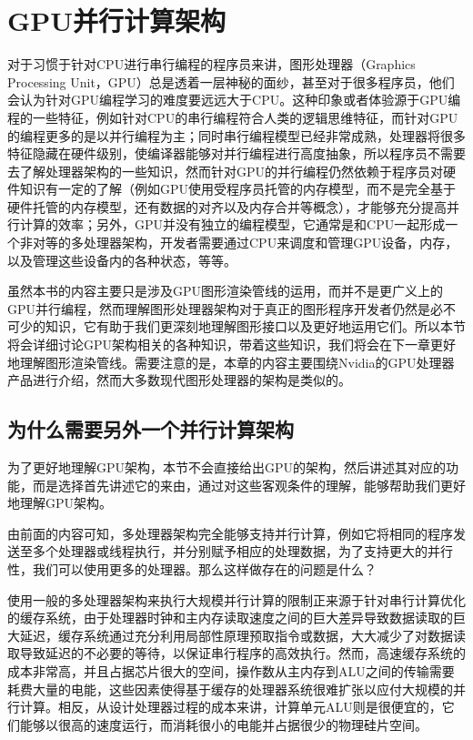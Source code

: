\section{GPU并行计算架构}
对于习惯于针对CPU进行串行编程的程序员来讲，图形处理器（Graphics Processing Unit，GPU）总是透着一层神秘的面纱，甚至对于很多程序员，他们会认为针对GPU编程学习的难度要远远大于CPU。这种印象或者体验源于GPU编程的一些特征，例如针对CPU的串行编程符合人类的逻辑思维特征，而针对GPU的编程更多的是以并行编程为主；同时串行编程模型已经非常成熟，处理器将很多特征隐藏在硬件级别，使编译器能够对并行编程进行高度抽象，所以程序员不需要去了解处理器架构的一些知识，然而针对GPU的并行编程仍然依赖于程序员对硬件知识有一定的了解（例如GPU使用受程序员托管的内存模型，而不是完全基于硬件托管的内存模型，还有数据的对齐以及内存合并等概念），才能够充分提高并行计算的效率；另外，GPU并没有独立的编程模型，它通常是和CPU一起形成一个非对等的多处理器架构，开发者需要通过CPU来调度和管理GPU设备，内存，以及管理这些设备内的各种状态，等等。

虽然本书的内容主要只是涉及GPU图形渲染管线的运用，而并不是更广义上的GPU并行编程，然而理解图形处理器架构对于真正的图形程序开发者仍然是必不可少的知识，它有助于我们更深刻地理解图形接口以及更好地运用它们。所以本节将会详细讨论GPU架构相关的各种知识，带着这些知识，我们将会在下一章更好地理解图形渲染管线。需要注意的是，本章的内容主要围绕Nvidia的GPU处理器产品进行介绍，然而大多数现代图形处理器的架构是类似的。






\subsection{为什么需要另外一个并行计算架构}
为了更好地理解GPU架构，本节不会直接给出GPU的架构，然后讲述其对应的功能，而是选择首先讲述它的来由，通过对这些客观条件的理解，能够帮助我们更好地理解GPU架构。

由前面的内容可知，多处理器架构完全能够支持并行计算，例如它将相同的程序发送至多个处理器或线程执行，并分别赋予相应的处理数据，为了支持更大的并行性，我们可以使用更多的处理器。那么这样做存在的问题是什么？

使用一般的多处理器架构来执行大规模并行计算的限制正来源于针对串行计算优化的缓存系统，由于处理器时钟和主内存读取速度之间的巨大差异导致数据读取的巨大延迟，缓存系统通过充分利用局部性原理预取指令或数据，大大减少了对数据读取导致延迟的不必要的等待，以保证串行程序的高效执行。然而，高速缓存系统的成本非常高，并且占据芯片很大的空间，操作数从主内存到ALU之间的传输需要耗费大量的电能，这些因素使得基于缓存的处理器系统很难扩张以应付大规模的并行计算。相反，从设计处理器过程的成本来讲，计算单元ALU则是很便宜的，它们能够以很高的速度运行，而消耗很小的电能并占据很少的物理硅片空间。


